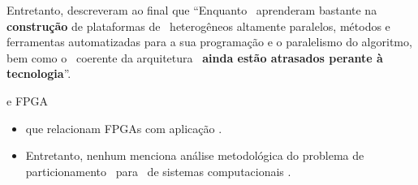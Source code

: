   
   \begin{frame}{\cite{Jozwiak2017}} 
      
      \begin{block}{Entretanto, descreveram ao final que \cite{Jozwiak2017}}
         ``Enquanto \designers\ aprenderam bastante na \textbf{construção} de plataformas de \hardware\ heterogêneos altamente paralelos, métodos e ferramentas automatizadas para a sua programação e o paralelismo do algoritmo, bem como o \codesign\ coerente da arquitetura \hs\ \textbf{ainda estão atrasados perante à tecnologia}''.
      \end{block}
   \end{frame}


   \begin{frame}{\Wearable e FPGA}
      \begin{itemize}
         \setlength{\itemsep}{2em}
         \item \cite{Plessl2003, Ahola2007, Abdelhedi2016, Narumi2016, Lee2015} que relacionam FPGAs com aplicação \wearable.
         
         \item Entretanto, nenhum menciona análise metodológica do problema de particionamento \hs\ para \design\ de sistemas computacionais \wearables.
      \end{itemize}
   \end{frame}